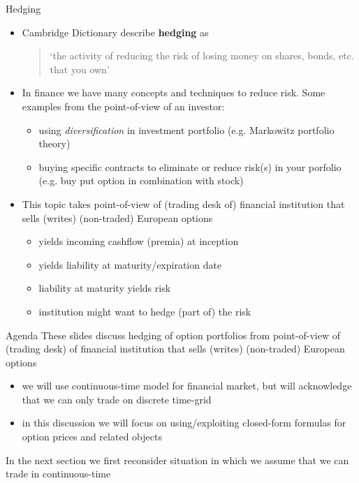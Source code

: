 \documentclass[pdf, handout]{beamer}
\begin{document}
\begin{frame}{Hedging}
\begin{itemize}
\item Cambridge Dictionary describe \textbf{hedging}  as
\begin{quote}
`the activity of reducing the risk of losing money on shares, bonds, etc. that you own'
\end{quote}
\item In finance we have many concepts and techniques to reduce risk. Some examples from the point-of-view of an investor:
\begin{itemize}
\item using \emph{diversification}  in investment portfolio  (e.g. Markowitz portfolio theory)
\item buying specific contracts to eliminate or reduce risk(s)
in your porfolio
(e.g. buy put option in combination with stock)
\end{itemize}
\item This topic takes point-of-view 
of (trading desk of)  financial institution that sells (writes)
(non-traded) European
options 
\begin{itemize}
\item yields incoming cashflow (premia) at inception
\item yields liability at maturity/expiration date
\item liability at maturity yields risk
\item institution might want to hedge (part of) the risk
\end{itemize}
\end{itemize}
\end{frame}





\begin{frame}{Agenda}
These slides discuss hedging of option portfolios from
point-of-view 
of (trading desk) of financial institution 
that sells (writes)
(non-traded) European
options 
\begin{itemize}
\item we will use continuous-time model for financial market, but will acknowledge that we can only trade on discrete time-grid 
\item in this discussion we will focus on using/exploiting closed-form formulas for
option prices and related objects
\end{itemize}
In the next section we first reconsider situation
in which  we assume that we can trade in continuous-time
\end{frame}
\end{document}
